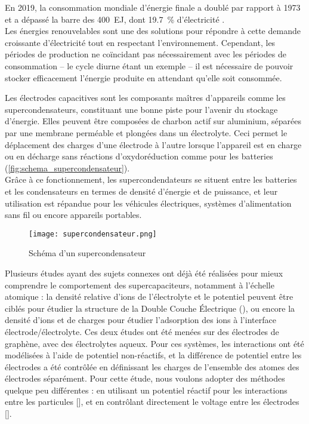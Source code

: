 En 2019, la consommation mondiale d'énergie finale a doublé par rapport à 1973 et a dépassé la barre des \qty{400}{\exa \joule}, dont \qty{19.7}{\percent} d'électricité \cite{birol_key_nodate}.\\
Les énergies renouvelables sont une des solutions pour répondre à cette demande croissante d'électricité tout en respectant l'environnement. Cependant, les périodes de production ne coïncidant pas nécessairement avec les périodes de consommation -- le cycle diurne étant un exemple -- il est nécessaire de pouvoir stocker efficacement l'énergie produite en attendant qu'elle soit consommée.

Les électrodes capacitives sont les composants maîtres d'appareils comme les supercondensateurs, constituant une bonne piste pour l'avenir du stockage d'énergie. Elles peuvent être composées de charbon actif sur aluminium, séparées par une membrane perméable et plongées dans un électrolyte. Ceci permet le déplacement des charges d'une électrode à l'autre lorsque l'appareil est en charge ou en décharge sans réactions d'oxydoréduction comme pour les batteries (\autoref{fig:schema_supercondensateur}).\\
Grâce à ce fonctionnement, les supercondendateurs se situent entre les batteries et les condensateurs en termes de densité d'énergie et de puissance, et leur utilisation est répandue pour les véhicules électriques, systèmes d'alimentation sans fil ou encore appareils portables.

\begin{figure}[h!]
    \centering
    \texttt{[image: supercondensateur.png]}
    \caption{Schéma d'un supercondensateur}
    \label{fig:schema_supercondensateur}
\end{figure}

Plusieurs études ayant des sujets connexes ont déjà été réalisées pour mieux comprendre le comportement des supercapaciteurs, notamment à l'échelle atomique : la densité relative d'ions de l'électrolyte et le potentiel peuvent être ciblés pour étudier la structure de la Double Couche Électrique (\edl{})\cite{jiang_molecular_2016}, ou encore la densité d'ions et de charges pour étudier l'adsorption des ions à l'interface électrode/électrolyte\cite{cole_ion_2011}.
Ces deux études ont été menées sur des électrodes de graphène, avec des électrolytes aqueux. Pour ces systèmes, les interactions ont été modélisées à l'aide de potentiel non-réactifs, et la différence de potentiel entre les électrodes a été contrôlée en définissant les charges de l'ensemble des atomes des électrodes séparément.
Pour cette étude, nous voulons adopter des méthodes quelque peu différentes : en utilisant un potentiel réactif pour les interactions entre les particules [\reaxff{}], et en contrôlant directement le voltage entre les électrodes [\echemdid{}].

